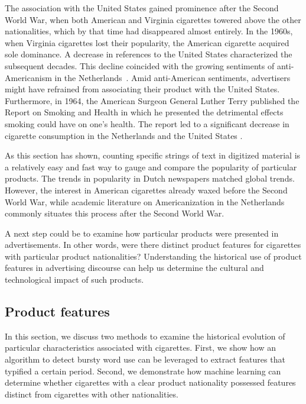 \documentclass[USenglish]{article}
\begin{document}
The association with the United States gained prominence after the Second World War, when both American and Virginia cigarettes towered above the other nationalities, which by that time had disappeared almost entirely. In the 1960s, when Virginia cigarettes lost their popularity, the American cigarette acquired sole dominance. A decrease in references to the United States characterized the subsequent decades.
%
This decline coincided with the growing sentiments of anti-Americanism in the Netherlands~\cite{kroes_european_2006,gienow-hecht_always_2006}. Amid anti-American sentiments, advertisers might have refrained from associating their product with the United States. Furthermore, in 1964, the American Surgeon General Luther Terry published the Report on Smoking and Health in which he presented the detrimental effects smoking could have on one’s health. The report led to a significant decrease in cigarette consumption in the Netherlands and the United States \cite{hoffmann_less_2001}.

As this section has shown, counting specific strings of text in digitized material is a relatively easy and fast way to gauge and compare the popularity of particular products. The trends in popularity in Dutch newspapers matched global trends. However, the interest in American cigarettes already waxed before the Second World War, while academic literature on Americanization in the Netherlands commonly situates this process after the Second World War.

A next step could be to examine how particular products were presented in advertisements. In other words, were there distinct product features for cigarettes with particular product nationalities? Understanding the historical use of product features in advertising discourse can help us determine the cultural and technological impact of such products. 

\subsection{Product features}
In this section, we discuss two methods to examine the historical evolution of particular characteristics associated with cigarettes. First, we show how an algorithm to detect bursty word use can be leveraged to extract features that typified a certain period. Second, we demonstrate how machine learning can  determine whether cigarettes with a clear product nationality possessed  features distinct from cigarettes with other nationalities. 
\end{document}
